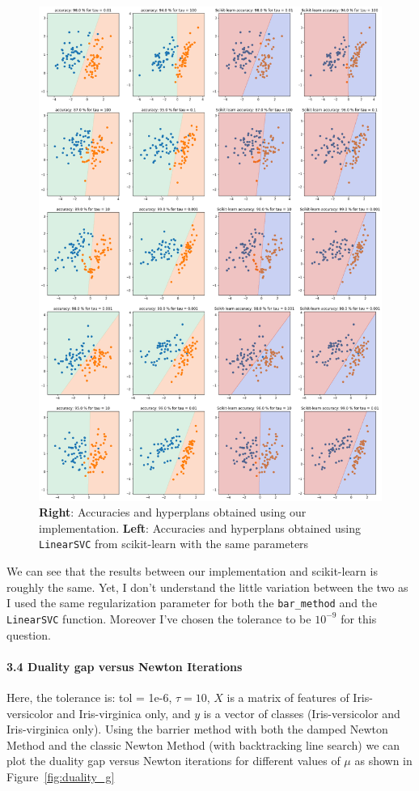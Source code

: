 \documentclass[11pt]{article}
\numberwithin{figure}{section} %
\begin{document}
\begin{figure}[H] 
	\centering
	\includegraphics[width=\textwidth]{images/random_data.png}
	\caption{\textbf{Right}: Accuracies and hyperplans obtained using our implementation. \textbf{Left}: Accuracies and hyperplans obtained using \texttt{LinearSVC} from scikit-learn with the same parameters}
	\label{fig:random_test}
\end{figure}

We can see that the results between our implementation and scikit-learn is roughly the same. Yet, I don't understand the little variation between the two as I used the same
regularization parameter for both the \texttt{bar\_method} and the \texttt{LinearSVC} function. Moreover I've chosen the tolerance to be $10^{-9}$ for this question.

\paragraph{3.4 Duality gap versus Newton Iterations}
Here, the tolerance is: tol = 1e-6, $\tau=10$, $X$ is a matrix of features of Iris-versicolor and Iris-virginica only, and $y$ is a vector of classes (Iris-versicolor and Iris-virginica only).
Using the barrier method with both the damped Newton Method and the classic Newton Method (with backtracking line search) we can plot the duality gap versus Newton iterations for different
values of $\mu$ as shown in Figure~\ref{fig:duality_g}
\end{document}
